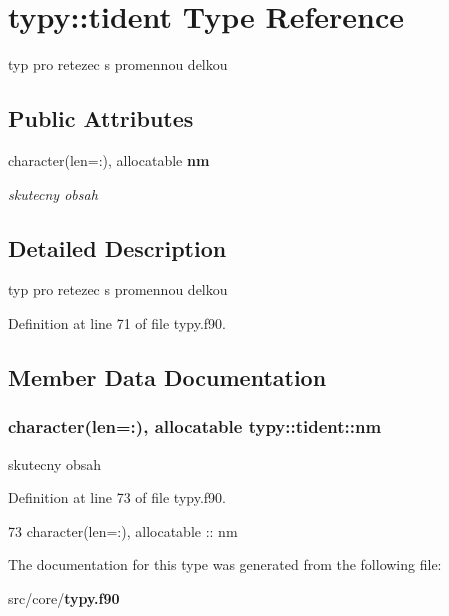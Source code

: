 \section{typy\+:\+:tident Type Reference}
\label{structtypy_1_1tident}


typ pro retezec s promennou delkou  


\subsection*{Public Attributes}
\begin{DoxyCompactItemize}
\item 
character(len=\+:), allocatable {\bf nm}
\begin{DoxyCompactList}\small\item\em skutecny obsah \end{DoxyCompactList}\end{DoxyCompactItemize}


\subsection{Detailed Description}
typ pro retezec s promennou delkou 

Definition at line 71 of file typy.\+f90.



\subsection{Member Data Documentation}
\subsubsection[{nm}]{\setlength{\rightskip}{0pt plus 5cm}character(len=\+:), allocatable typy\+::tident\+::nm}\label{structtypy_1_1tident_a51d911964cfb37b539daa7c9dfe5b530}


skutecny obsah 



Definition at line 73 of file typy.\+f90.


\begin{DoxyCode}
73         \textcolor{keywordtype}{character(len=:)}, \textcolor{keywordtype}{allocatable} :: nm
\end{DoxyCode}


The documentation for this type was generated from the following file\+:\begin{DoxyCompactItemize}
\item 
src/core/{\bf typy.\+f90}\end{DoxyCompactItemize}
